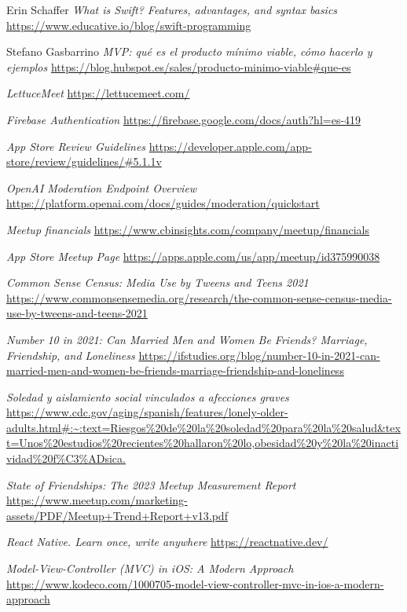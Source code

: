 
\begin{thebibliography}{9}
    Erin Schaffer
    \textit{What is Swift? Features, advantages, and syntax basics}
    \url{https://www.educative.io/blog/swift-programming}

    Stefano Gasbarrino
    \textit{MVP: qué es el producto mínimo viable, cómo hacerlo y ejemplos}
    \url{https://blog.hubspot.es/sales/producto-minimo-viable#que-es}

    \textit{LettuceMeet}
    \url{https://lettucemeet.com/}

    \textit{Firebase Authentication}
    \url{https://firebase.google.com/docs/auth?hl=es-419}

    \textit{App Store Review Guidelines}
    \url{https://developer.apple.com/app-store/review/guidelines/#5.1.1v}

    \textit{OpenAI Moderation Endpoint Overview}
    \url{https://platform.openai.com/docs/guides/moderation/quickstart}

    \textit{Meetup financials}
    \url{https://www.cbinsights.com/company/meetup/financials}

    \textit{App Store Meetup Page}
    \url{https://apps.apple.com/us/app/meetup/id375990038}

    \textit{Common Sense Census: Media Use by Tweens and Teens 2021}
    \url{https://www.commonsensemedia.org/research/the-common-sense-census-media-use-by-tweens-and-teens-2021}

    \textit{Number 10 in 2021: Can Married Men and Women Be Friends? Marriage, Friendship, and Loneliness}
    \url{https://ifstudies.org/blog/number-10-in-2021-can-married-men-and-women-be-friends-marriage-friendship-and-loneliness}

    \textit{Soledad y aislamiento social vinculados a afecciones graves}
    \url{https://www.cdc.gov/aging/spanish/features/lonely-older-adults.html#:~:text=Riesgos%20de%20la%20soledad%20para%20la%20salud&text=Unos%20estudios%20recientes%20hallaron%20lo,obesidad%20y%20la%20inactividad%20f%C3%ADsica.}

    \textit{State of Friendships: The 2023 Meetup Measurement Report}
    \url{https://www.meetup.com/marketing-assets/PDF/Meetup+Trend+Report+v13.pdf}

    \textit{React Native. Learn once, write anywhere}
    \url{https://reactnative.dev/}

    \textit{Model-View-Controller (MVC) in iOS: A Modern Approach}
    \url{https://www.kodeco.com/1000705-model-view-controller-mvc-in-ios-a-modern-approach}

\end{thebibliography}